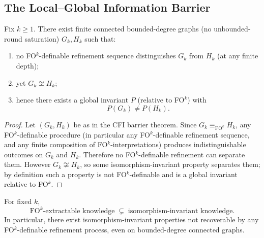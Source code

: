 \subsection{The Local--Global Information Barrier}

\begin{theorem}
Fix $k\ge 1$. There exist finite connected bounded-degree graphs (no unbounded-round saturation) $G_k,H_k$ such that:
\begin{enumerate}
\item no FO$^k$-definable refinement sequence distinguishes $G_k$ from $H_k$ (at any finite depth);
\item yet $G_k \not\cong H_k$;
\item hence there exists a global invariant $P$ (relative to FO$^k$) with
\[
P(G_k)\ne P(H_k).
\]
\end{enumerate}
\end{theorem}

\begin{proof}
Let $(G_k,H_k)$ be as in the CFI barrier theorem. Since $G_k \equiv_{\mathrm{FO}^k} H_k$, any FO$^k$-definable
procedure (in particular any FO$^k$-definable refinement sequence, and any finite composition of FO$^k$-interpretations)
produces indistinguishable outcomes on $G_k$ and $H_k$. Therefore no FO$^k$-definable refinement can separate them.
However $G_k\not\cong H_k$, so some isomorphism-invariant property separates them; by definition such a property is not
FO$^k$-definable and is a global invariant relative to FO$^k$.
\end{proof}

\begin{corollary}
For fixed $k$,
\[
\mathrm{FO}^k\text{-extractable knowledge} \;\subsetneq\; \text{isomorphism-invariant knowledge}.
\]
In particular, there exist isomorphism-invariant properties not recoverable by any FO$^k$-definable refinement process,
even on bounded-degree connected graphs.
\end{corollary}


